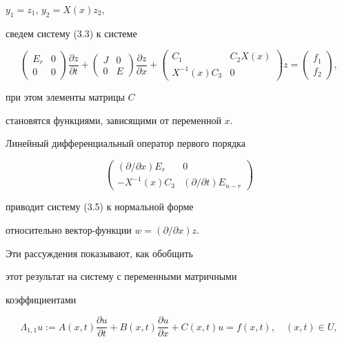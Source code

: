 $y_{1}=z_{1}$, $y_{2}=X(x)z_{2}$,


сведем систему (3.3) к системе


\begin{equation}


\begin{pmatrix}E_r&0\\ 0&0\end{pmatrix}\frac{\partial z}{\partial t}+


\begin{pmatrix}J&0\\ 0&E\end{pmatrix}\frac{\partial z}{\partial x}+


\begin{pmatrix}C_{1}& C_{2}X(x)\\ X^{-1}(x)C_{3} & 0\end{pmatrix}z=


\begin{pmatrix}f_{1}\\ f_{2}\end{pmatrix},


\end{equation}


при этом элементы матрицы $C$


становятся функциями, зависящими от переменной $x$.


Линейный дифференциальный оператор первого порядка


$$


\begin{pmatrix} (\partial /\partial x)E_r & 0 \\


-X^{-1}(x)C_3 & (\partial /\partial t)E_{n-r}\end{pmatrix}


$$


приводит систему (3.5) к нормальной форме


относительно вектор-функции $w=(\partial /\partial x)z$.





Эти рассуждения показывают, как обобщить


этот результат на систему с переменными матричными


коэффициентами


\begin{equation}


\Lambda _{1,1}u:=A(x,t)\frac{\partial u}{\partial t}+


B(x,t)\frac{\partial u}{\partial x}+C(x,t)u=f(x,t),\quad (x,t)\in U,


\end{equation}


